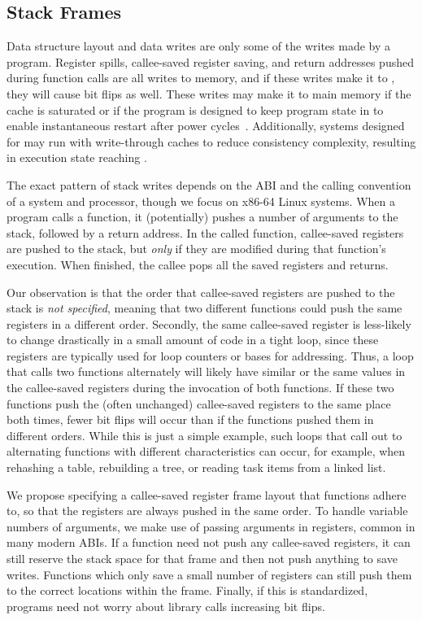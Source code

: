 \subsection{Stack Frames}
\label{sec:stack}

Data structure layout and data writes are only some of the writes made by a
program. Register spills, callee-saved register saving,
and return addresses pushed during function calls are all writes to memory, and
if these writes make it to \NVM, they will cause bit flips as well. These writes
may make it to main memory if the cache is saturated or if the program is
designed to keep program state in \NVM to enable instantaneous restart after
power cycles~\cite{Narayanan:asplos12}. Additionally, systems designed for \NVM may run with write-through
caches to reduce consistency complexity, resulting in execution state reaching
\NVM.

The exact pattern of stack writes depends on the ABI and the calling convention of a system and
processor, though we focus on x86-64 Linux systems. When a program calls a function, it
(potentially) pushes a number of arguments to the stack, followed by a return address.  In the
called function, callee-saved registers are pushed to the stack, but \emph{only} if they are modified
during that function's execution. When finished, the callee pops all the saved registers and
returns.

Our observation is that the order that callee-saved registers are pushed to the
stack is \textit{not specified}, meaning that two different functions could push
the same registers in a different order. Secondly, the same callee-saved register
is less-likely to change drastically in a small amount of code in a tight loop,
since these registers are typically used for loop counters or bases for
addressing. Thus, a loop that calls two functions alternately will likely have
similar or the same values in the callee-saved registers during the invocation
of both functions.
If these two functions push the (often unchanged)
callee-saved registers to the same place both times, fewer bit
flips will occur than if the functions pushed them in different orders.
While this is just a simple example,
such loops that call out to alternating functions with different characteristics can occur, for
example, when rehashing a table, rebuilding a tree, or reading task items from a linked
list.

We propose specifying a callee-saved register frame layout that functions adhere
to, so that the registers are always pushed in the same order. To handle
variable numbers of arguments, we make use of passing arguments in registers,
common in many modern ABIs. If a function
need not push any callee-saved registers, it can still reserve the stack space
for that frame and then not push anything to save writes. Functions which only
save a small number of registers can still push them to the correct locations
within the frame. Finally, if this is standardized, programs need not worry
about library calls increasing bit flips.

